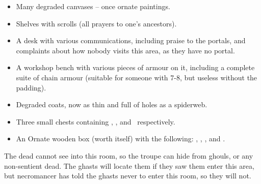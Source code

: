 \begin{multicols}{2}
\begin{itemize}
  \item
  Many degraded canvases -- once ornate paintings.
  \item
  Shelves with scrolls (all prayers to one's ancestors).
  \item
  A desk with various communications, including praise to the portals, and complaints about how nobody visits this area, as they have no portal.
  \item
  A workshop bench with various pieces of armour on it, including a complete suite of chain armour (suitable for someone with  7-8, but useless without the padding).
  \item
  Degraded coats, now as thin and full of holes as a spiderweb.
  \item
  Three small chests containing \lootMedium, \lootBig, and \lootBig\ respectively.
  \item
  An Ornate wooden box (worth  itself) with the following: \lootJewellery, \lootJewellery, \lootJewellery, and \lootJewellery.
\end{itemize}

The dead cannot see into this room, so the troupe can hide from ghouls, or any non-sentient dead.
The ghasts will locate them if they saw them enter this area, but \gls{necromancer} has told the ghasts never to enter this room, so they will not.

\end{multicols}
